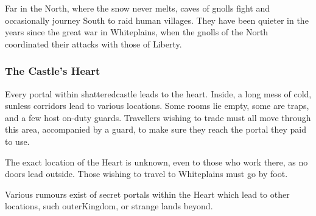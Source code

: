 \begin{multicols}{2}
Far in the North, where the snow never melts, caves of gnolls fight and occasionally journey South to raid human villages.
They have been quieter in the years since the great war in Whiteplains, when the gnolls of the North coordinated their attacks with those of Liberty.

\subsubsection{The Castle's Heart}\label{whiteland_heart}

Every portal within \gls{shatteredcastle} leads to the heart.
Inside, a long mess of cold, sunless corridors lead to various locations.
Some rooms lie empty, some are traps, and a few host on-duty guards.
Travellers wishing to trade must all move through this area, accompanied by a guard, to make sure they reach the portal they paid to use.

The exact location of the Heart is unknown, even to those who work there, as no doors lead outside.
Those wishing to travel to Whiteplains must go by foot.

Various rumours exist of secret portals within the Heart which lead to other locations, such \gls{outerKingdom}, or strange lands beyond.

\iftoggle{players}{
  \begin{itemize}

    \item
    A lost noble, who once stood to inherit an estate until \gls{king} put all the nobility to death.
    So far none of the guard have noticed her accent.
    So far\ldots
    \item
    A loyal subject of \gls{king}, intent on proving his worth in the glorious \gls{guard}.
    With enough hard work, anyone can live a worthy life.
    \item
    A thieving orphan, who was caught stealing far too much.
    He escaped the noose by convincing his local village master that he would do honest work in the \gls{guard}.

  \end{itemize}
}{
\begin{encounters}{Whiteplains}

  South & North & Result \\\hline
  \li &  Labyrinth portal (page \pageref{labyrinth}). \\
  \li & Mana lake. \\
  \li & Hunting elves (page \pageref{elf}). \\
  \li & A hidden human settlement that doesn't like paying taxes. \\
  \li \lii $2D6$ Gnoll hunters. \\
  \li \lii Seasonal Encounter. \\
  & \lii $4D6-3$ Night Guard in training. \\
  & \lii $3D6-2$ Human Traders. \\


\end{encounters}}
\end{multicols}
